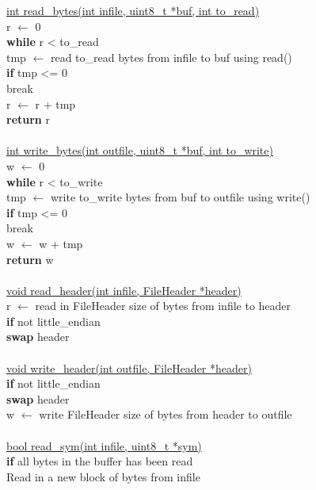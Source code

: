 \documentclass[12pt]{article}
\begin{document}
\underline{int read\_bytes(int infile, uint8\_t *buf, int to\_read)} \\
\indent r $\leftarrow$ 0 \\
\indent \textbf{while} r < to\_read \\
\indent \indent \indent tmp $\leftarrow$ read to\_read bytes from infile to buf using read() \\
\indent \indent \textbf{if} tmp <= 0 \\
\indent \indent \indent break \\
\indent \indent r $\leftarrow$ r + tmp \\
\indent \textbf{return} r \\
\\
\underline{int write\_bytes(int outfile, uint8\_t *buf, int to\_write)} \\
\indent w $\leftarrow$ 0 \\
\indent \textbf{while} r < to\_write\\
\indent \indent \indent tmp $\leftarrow$ write to\_write bytes from buf to outfile using write() \\
\indent \indent \textbf{if} tmp <= 0 \\
\indent \indent \indent break \\
\indent \indent w $\leftarrow$ w + tmp \\
\indent \textbf{return} w \\
\\
\underline{void read\_header(int infile, FileHeader *header)} \\
\indent r $\leftarrow$ read in FileHeader size of bytes from infile to header \\
\indent \textbf{if} not little\_endian \\
\indent \indent \textbf{swap} header \\
\\
\underline{void write\_header(int outfile, FileHeader *header)} \\
\indent \textbf{if} not little\_endian \\
\indent \indent \textbf{swap} header \\
\indent w $\leftarrow$ write FileHeader size of bytes from header to outfile \\
\\
\underline{bool read\_sym(int infile, uint8\_t *sym)} \\
\indent \textbf{if} all bytes in the buffer has been read \\
\indent \indent Read in a new block of bytes from infile \\
\end{document}
